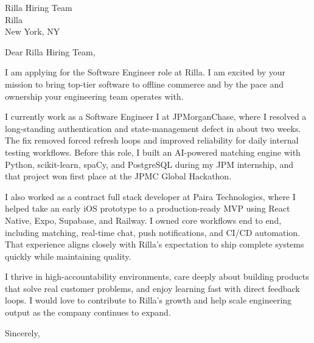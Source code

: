 \documentclass[11pt]{letter}
\date{\today}
\begin{document}
\begin{letter}{Rilla Hiring Team\\Rilla\\New York, NY}

\opening{Dear Rilla Hiring Team,}

I am applying for the Software Engineer role at Rilla. I am excited by your mission to bring top-tier software to offline commerce and by the pace and ownership your engineering team operates with.

I currently work as a Software Engineer I at JPMorganChase, where I resolved a long-standing authentication and state-management defect in about two weeks. The fix removed forced refresh loops and improved reliability for daily internal testing workflows. Before this role, I built an AI-powered matching engine with Python, scikit-learn, spaCy, and PostgreSQL during my JPM internship, and that project won first place at the JPMC Global Hackathon.

I also worked as a contract full stack developer at Paira Technologies, where I helped take an early iOS prototype to a production-ready MVP using React Native, Expo, Supabase, and Railway. I owned core workflows end to end, including matching, real-time chat, push notifications, and CI/CD automation. That experience aligns closely with Rilla's expectation to ship complete systems quickly while maintaining quality.

I thrive in high-accountability environments, care deeply about building products that solve real customer problems, and enjoy learning fast with direct feedback loops. I would love to contribute to Rilla's growth and help scale engineering output as the company continues to expand.

\closing{Sincerely,}

\end{letter}
\end{document}
